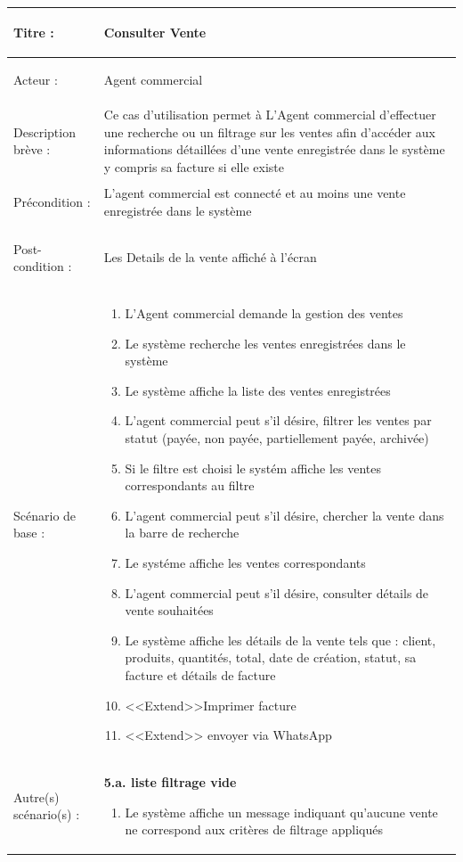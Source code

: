 \begin{longtable}{|>{\bfseries\raggedright\arraybackslash}p{3.5cm}|p{\dimexpr\textwidth-3.5cm-4\tabcolsep-2\arrayrulewidth}|}
\hline
Titre : & Consulter Vente \\
\hline
Acteur : & Agent commercial \\
\hline
Description brève : & Ce cas d'utilisation permet à L'Agent commercial d'effectuer une recherche ou un filtrage sur les ventes afin d'accéder aux informations détaillées d'une vente enregistrée dans le système y compris sa facture si elle existe \\
\hline
Précondition : & L'agent commercial est connecté et au moins une vente enregistrée dans le système \\
\hline
Post-condition : & Les Details de la vente affiché à l'écran \\
\hline
Scénario de base : &
\begin{enumerate}[leftmargin=1.5em, topsep=2pt, itemsep=1pt]
  \item L'Agent commercial demande la gestion des ventes
  \item Le système recherche les ventes enregistrées dans le système
  \item Le système affiche la liste des ventes enregistrées
  \item L'agent commercial peut s'il désire, filtrer les ventes par statut (payée, non payée, partiellement payée, archivée)
  \item Si le filtre est choisi le systém affiche les ventes correspondants au filtre
  \item L'agent commercial peut s'il désire, chercher la vente dans la barre de recherche
  \item Le systéme affiche les ventes correspondants
  \item L'agent commercial peut s'il désire, consulter détails de vente souhaitées
  \item Le système affiche les détails de la vente tels que : client, produits, quantités, total, date de création, statut, sa facture et détails de facture
  \item <<Extend>>Imprimer facture
  \item <<Extend>> envoyer via WhatsApp
\end{enumerate} \\
\hline
Autre(s) scénario(s) : &
\textbf{5.a. liste filtrage vide}
\begin{enumerate}[leftmargin=1.5em, topsep=2pt, itemsep=1pt]
  \item Le système affiche un message indiquant qu'aucune vente ne correspond aux critères de filtrage appliqués

\end{enumerate}
\end{longtable}
